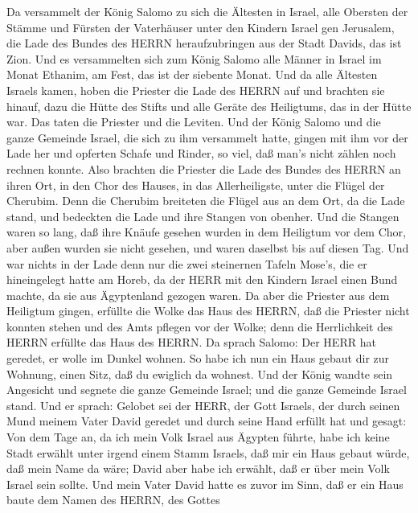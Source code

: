  Da versammelt der König Salomo zu sich die Ältesten in
Israel, alle Obersten der Stämme und Fürsten der Vaterhäuser unter den
Kindern Israel gen Jerusalem, die Lade des Bundes des HERRN
heraufzubringen aus der Stadt Davids, das ist Zion.  Und es
versammelten sich zum König Salomo alle Männer in Israel im Monat
Ethanim, am Fest, das ist der siebente Monat.  Und da alle
Ältesten Israels kamen, hoben die Priester die Lade des HERRN auf
 und brachten sie hinauf, dazu die Hütte des Stifts und alle
Geräte des Heiligtums, das in der Hütte war. Das taten die Priester und
die Leviten.  Und der König Salomo und die ganze Gemeinde
Israel, die sich zu ihm versammelt hatte, gingen mit ihm vor der Lade
her und opferten Schafe und Rinder, so viel, daß man's nicht zählen noch
rechnen konnte.  Also brachten die Priester die Lade des
Bundes des HERRN an ihren Ort, in den Chor des Hauses, in das
Allerheiligste, unter die Flügel der Cherubim.  Denn die
Cherubim breiteten die Flügel aus an dem Ort, da die Lade stand, und
bedeckten die Lade und ihre Stangen von obenher.  Und die
Stangen waren so lang, daß ihre Knäufe gesehen wurden in dem Heiligtum
vor dem Chor, aber außen wurden sie nicht gesehen, und waren daselbst
bis auf diesen Tag.  Und war nichts in der Lade denn nur die
zwei steinernen Tafeln Mose's, die er hineingelegt hatte am Horeb, da
der HERR mit den Kindern Israel einen Bund machte, da sie aus
Ägyptenland gezogen waren.  Da aber die Priester aus dem
Heiligtum gingen, erfüllte die Wolke das Haus des HERRN, 
daß die Priester nicht konnten stehen und des Amts pflegen vor der
Wolke; denn die Herrlichkeit des HERRN erfüllte das Haus des HERRN.
 Da sprach Salomo: Der HERR hat geredet, er wolle im Dunkel
wohnen.  So habe ich nun ein Haus gebaut dir zur Wohnung,
einen Sitz, daß du ewiglich da wohnest.  Und der König
wandte sein Angesicht und segnete die ganze Gemeinde Israel; und die
ganze Gemeinde Israel stand.  Und er sprach: Gelobet sei
der HERR, der Gott Israels, der durch seinen Mund meinem Vater David
geredet und durch seine Hand erfüllt hat und gesagt:  Von
dem Tage an, da ich mein Volk Israel aus Ägypten führte, habe ich keine
Stadt erwählt unter irgend einem Stamm Israels, daß mir ein Haus gebaut
würde, daß mein Name da wäre; David aber habe ich erwählt, daß er über
mein Volk Israel sein sollte.  Und mein Vater David hatte
es zuvor im Sinn, daß er ein Haus baute dem Namen des HERRN, des Gottes
